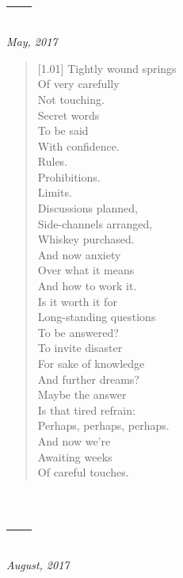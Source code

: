 \section*{---}

\vspace{-0.5cm}

\hfill\textit{May, 2017}

\begin{verse}[1.01\textwidth]
  Tightly wound springs\\
  Of very carefully\\
  Not touching.\\
  \vin Secret words\\
  \vin To be said\\
  \vin With confidence.\\
  Rules.\\
  Prohibitions.\\
  Limits.\\
  \vin Discussions planned,\\
  \vin Side-channels arranged,\\
  \vin Whiskey purchased.\\
  And now anxiety\\
  Over what it means\\
  And how to work it.\\
  \vin Is it worth it for\\
  \vin Long-standing questions\\
  \vin To be answered?\\
  To invite disaster\\
  For sake of knowledge\\
  And further dreams?\\
  \vin Maybe the answer\\
  \vin Is that tired refrain:\\
  \vin Perhaps, perhaps, perhaps.\\
  And now we're\\
  Awaiting weeks\\
  Of careful touches.
\end{verse}
\newpage

\section*{---}

\hfill\textit{August, 2017}


